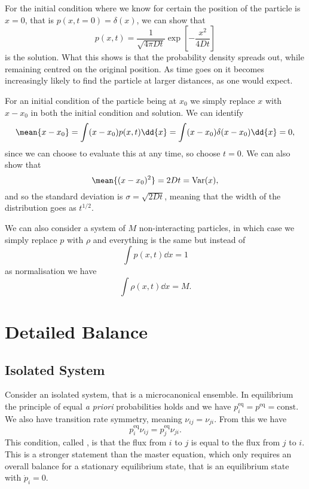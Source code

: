 \documentclass[fleqn]{NotesClass}
\DeclareMathOperator{\Var}{Var}
\begin{document}
    For the initial condition where we know for certain the position of the particle is \(x = 0\), that is \(p(x, t = 0) = \delta(x)\), we can show that
    \begin{equation}
        p(x, t) = \frac{1}{\sqrt{4\pi Dt}}\exp\left[ -\frac{x^2}{4Dt} \right]
    \end{equation}
    is the solution.
    What this shows is that the probability density spreads out, while remaining centred on the original position.
    As time goes on it becomes increasingly likely to find the particle at larger distances, as one would expect.
    
    For an initial condition of the particle being at \(x_0\) we simply replace \(x\) with \(x - x_0\) in both the initial condition and solution.
    We can identify
    \begin{equation}
        \mean{x - x_0} = \int (x - x_0) p(x, t) \dd{x} = \int (x - x_0)\delta(x - x_0) \dd{x} = 0,
    \end{equation}
    since we can choose to evaluate this at any time, so choose \(t = 0\).
    We can also show that
    \begin{equation}
        \mean{(x - x_0)^2} = 2Dt = \Var(x),
    \end{equation}
    and so the standard deviation is \(\sigma = \sqrt{2Dt}\), meaning that the width of the distribution goes as \(t^{1/2}\).
    
    We can also consider a system of \(M\) non-interacting particles, in which case we simply replace \(p\) with \(\rho\) and everything is the same but instead of
    \begin{equation}
        \int p(x, t) \dd{x} = 1
    \end{equation}
    as normalisation we have
    \begin{equation}
        \int \rho(x, t) \dd{x} = M.
    \end{equation}
    
    \section{Detailed Balance}
    \subsection{Isolated System}
    Consider an isolated system, that is a microcanonical ensemble.
    In equilibrium the principle of equal \textit{a priori} probabilities holds and we have \(p_i^{\mathrm{eq}} = p^{\mathrm{eq}} = \mathrm{const}\).
    We also have transition rate symmetry, meaning \(\nu_{ij} = \nu_{ji}\).
    From this we have
    \begin{equation}
        p_i^{\mathrm{eq}}\nu_{ij} = p_j^{\mathrm{eq}}\nu_{ji}.
    \end{equation}
    This condition, called , is that the flux from \(i\) to \(j\) is equal to the flux from \(j\) to \(i\).
    This is a stronger statement than the master equation, which only requires an overall balance for a stationary equilibrium state, that is an equilibrium state with \(\dot{p}_i = 0\).
    
\end{document}
